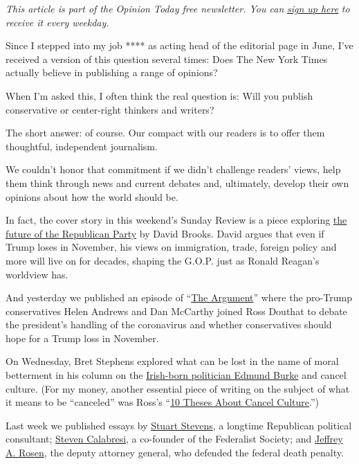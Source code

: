 \emph{This article is part of the Opinion Today free newsletter. You
can}
\href{https://www.nytimes.com/newsletters/opinion-todaynl}{\emph{sign up
here}} \emph{to receive it every weekday.}

Since I stepped into my job **** as acting head of the editorial page in
June, I've received a version of this question several times: Does The
New York Times actually believe in publishing a range of opinions?

When I'm asked this, I often think the real question is: Will you
publish conservative or center-right thinkers and writers?

The short answer: of course. Our compact with our readers is to offer
them thoughtful, independent journalism.

We couldn't honor that commitment if we didn't challenge readers' views,
help them think through news and current debates and, ultimately,
develop their own opinions about how the world should be.

In fact, the cover story in this weekend's Sunday Review is a piece
exploring
\href{https://www.nytimes.com/2020/08/07/opinion/republican-party-trump-2020.html}{the
future of the Republican Party} by David Brooks. David argues that even
if Trump loses in November, his views on immigration, trade, foreign
policy and more will live on for decades, shaping the G.O.P. just as
Ronald Reagan's worldview has.

And yesterday we published an episode of
``\href{https://www.nytimes.com/2020/08/06/opinion/the-argument-trump-coronavirus-election.html}{The
Argument}'' where the pro-Trump conservatives Helen Andrews and Dan
McCarthy joined Ross Douthat to debate the president's handling of the
coronavirus and whether conservatives should hope for a Trump loss in
November.

On Wednesday, Bret Stephens explored what can be lost in the name of
moral betterment in his column on the
\href{https://www.nytimes.com/2020/08/05/opinion/edmund-burke.html}{Irish-born
politician Edmund Burke} and cancel culture. (For my money, another
essential piece of writing on the subject of what it means to be
``canceled'' was Ross's
``\href{https://www.nytimes.com/2020/07/14/opinion/cancel-culture-.html}{10
Theses About Cancel Culture}.'')

Last week we published essays by
\href{https://www.nytimes.com/2020/07/29/opinion/trump-republican-party-racism.html}{Stuart
Stevens}, a longtime Republican political consultant;
\href{https://www.nytimes.com/2020/07/30/opinion/trump-delay-election-coronavirus.html}{Steven
Calabresi}, a co-founder of the Federalist Society; and
\href{https://www.nytimes.com/2020/07/27/opinion/federal-death-penalty.html}{Jeffrey
A. Rosen}, the deputy attorney general, who defended the federal death
penalty.


